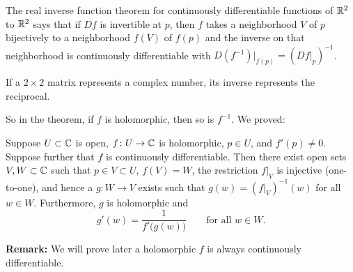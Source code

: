 \documentclass[10pt,aspectratio=169]{beamer}
\begin{document}
\begin{frame}
The real inverse function theorem
for continuously differentiable
functions of ${\mathbb{R}}^2$ to ${\mathbb{R}}^2$
says that if $Df$ is invertible at $p$, then $f$ takes a
neighborhood $V$ of $p$ bijectively to a neighborhood $f(V)$
of $f(p)$ and the inverse on that neighborhood is continuously
differentiable with $D(f^{-1})|_{f(p)} = (Df|_p)^{-1}$.

\medskip
\pause

If a $2 \times 2$ matrix represents a complex number, its inverse
represents the reciprocal.

\medskip
\pause

So in the theorem, if $f$ is holomorphic, then so is $f^{-1}$.
\pause
We proved:

\begin{theorem}
Suppose $U \subset {\mathbb{C}}$ is open, $f \colon U \to {\mathbb{C}}$ is holomorphic,
$p \in U$, and $f'(p) \not= 0$.  Suppose further that $f$ is continuously
differentiable.
\pause
Then there exist open sets $V, W \subset {\mathbb{C}}$ such that
$p \in V \subset U$, $f(V) = W$, the restriction $f|_V$ is injective
(one-to-one),
and hence a $g \colon W \to V$ exists such that
$g(w) = (f|_V)^{-1}(w)$ for all $w \in W$.
\pause
Furthermore, $g$ is holomorphic and
\begin{equation*}
g'(w) = \frac{1}{f'\bigl(g(w)\bigr)} \qquad \text{for all $w \in W$}.
\end{equation*}
\end{theorem}

\pause

\textbf{Remark:} We will prove later a holomorphic $f$ is always
continuously differentiable.
\end{frame}
\end{document}
